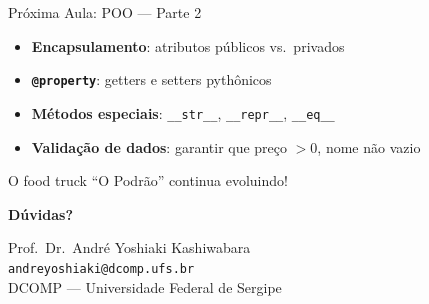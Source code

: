 \documentclass[aspectratio=169]{beamer}
\begin{document}
\begin{frame}{Próxima Aula: POO --- Parte 2}
  \begin{itemize}
    \item \textbf{Encapsulamento}: atributos públicos vs.\ privados
    \item \textbf{\texttt{@property}}: getters e setters pythônicos
    \item \textbf{Métodos especiais}: \texttt{\_\_str\_\_}, \texttt{\_\_repr\_\_},
          \texttt{\_\_eq\_\_}
    \item \textbf{Validação de dados}: garantir que preço $> 0$,
          nome não vazio
  \end{itemize}

  \vspace{0.5cm}
  O food truck ``O Podrão'' continua evoluindo!
\end{frame}

\begin{frame}[plain]
  \centering
  \vfill
  {\Large\textbf{Dúvidas?}}

  \vspace{1cm}
  {\normalsize Prof.\ Dr.\ André Yoshiaki Kashiwabara}\\
  {\small \texttt{andreyoshiaki@dcomp.ufs.br}}\\
  {\small DCOMP --- Universidade Federal de Sergipe}
  \vfill
\end{frame}
\end{document}
